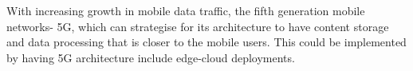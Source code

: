 \documentclass[sigconf,nonacm]{acmart}
\begin{document}
With increasing growth in mobile data traffic, the fifth generation mobile networks- 5G, which can strategise for its architecture to have content storage and data processing that is closer to the mobile users. This could be implemented by having 5G architecture include edge-cloud deployments.  


%






\appendix
\end{document}
